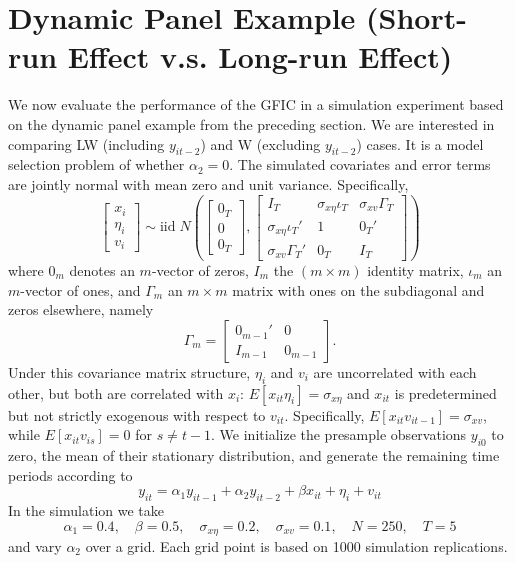 \section{Dynamic Panel Example (Short-run Effect v.s. Long-run Effect)}
\label{sec:SRvsLR}

We now evaluate the performance of the GFIC in a simulation experiment based on the dynamic panel example from the preceding section. We are interested in comparing LW (including $y_{it-2}$) and W (excluding $y_{it-2}$) cases. It is a model selection problem of whether $\alpha_2=0$. The simulated covariates and error terms are jointly normal with mean zero and unit variance. Specifically,
	\begin{equation}
		\left[\begin{array}{c}
			x_{i}\\
			\eta_i\\
			v_{i}
	 \end{array} \right]\sim \mbox{iid}\; N\left(\left[\begin{array}{c}0_T\\ 0\\ 0_T \end{array}\right] ,\left[\begin{array}{ccc}
	 	 I_T & \sigma_{x\eta}\iota_T&\sigma_{xv}\Gamma_T \\
	 		\sigma_{x\eta}\iota_T'& 1&0_T' \\
	 		\sigma_{xv}\Gamma_T'& 0_T&  I_T
	 \end{array}\right]\right)
	\end{equation}
where $0_m$ denotes an $m$-vector of zeros, $I_m$ the $(m\times m)$ identity matrix, $\iota_m$ an $m$-vector of ones, and $\Gamma_m$ an $m\times m$ matrix with ones on the subdiagonal and zeros elsewhere, namely
	\begin{equation}
		\Gamma_m = \left[\begin{array}{cc}
	 	0_{m-1}' & 0\\
	 	I_{m-1} & 0_{m-1}
	 \end{array}\right].
	\end{equation}
Under this covariance matrix structure, $\eta_i$ and $v_{i}$ are uncorrelated with each other, but both are correlated with $x_{i}$: $E[x_{it}\eta_i]=\sigma_{x\eta}$ and $x_{it}$ is predetermined but not strictly exogenous with respect to $v_{it}$. Specifically, $E[x_{it}v_{it-1}]=\sigma_{xv}$, while $E[x_{it}v_{is}]=0$ for $s\neq t-1$. We initialize the presample observations $y_{i0}$ to zero, the mean of their stationary distribution, and generate the remaining time periods according to 
$$y_{it} = \alpha_1 y_{it-1} +\alpha_2 y_{it-2} + \beta x_{it} + \eta_i + v_{it}$$
In the simulation we take
 \[ 
 \alpha_1 = 0.4,\quad \beta = 0.5,\quad \sigma_{x\eta}=0.2,\quad \sigma_{xv}=0.1,\quad N=250,\quad T=5
 \]  
 and vary $\alpha_2$ over a grid. Each grid point is based on 1000 simulation replications.

